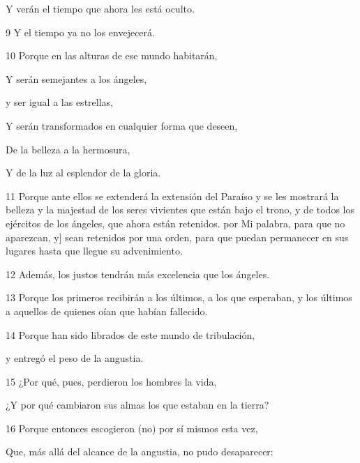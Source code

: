 \par Y verán el tiempo que ahora les está oculto.

\par 9 Y el tiempo ya no los envejecerá.

\par 10 Porque en las alturas de ese mundo habitarán,

\par Y serán semejantes a los ángeles,

\par y ser igual a las estrellas,

\par Y serán transformados en cualquier forma que deseen,

\par De la belleza a la hermosura,

\par Y de la luz al esplendor de la gloria.

\par 11 Porque ante ellos se extenderá la extensión del Paraíso y se les mostrará la belleza y la majestad de los seres vivientes que están bajo el trono, y de todos los ejércitos de los ángeles, que ahora están retenidos. por Mi palabra, para que no aparezcan, y] sean retenidos por una orden, para que puedan permanecer en sus lugares hasta que llegue su advenimiento.

\par 12 Además, los justos tendrán más excelencia que los ángeles.

\par 13 Porque los primeros recibirán a los últimos, a los que esperaban, y los últimos a aquellos de quienes oían que habían fallecido.

\par 14 Porque han sido librados de este mundo de tribulación,

\par y entregó el peso de la angustia.

\par 15 ¿Por qué, pues, perdieron los hombres la vida,

\par ¿Y por qué cambiaron sus almas los que estaban en la tierra?

\par 16 Porque entonces escogieron (no) por sí mismos esta vez,

\par Que, más allá del alcance de la angustia, no pudo desaparecer:

